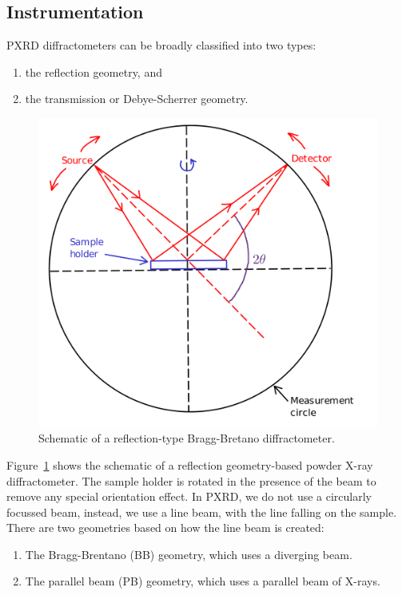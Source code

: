 \subsection{Instrumentation}

	PXRD diffractometers can be broadly classified into two types:%
%	
	\begin{enumerate}%
%	
	    \item the reflection geometry, and
	    
	    \item the transmission or Debye-Scherrer geometry.
	    
	\end{enumerate}
	
	\begin{figure}
		\centering
		\includegraphics[scale=0.15]{bragg_bretano_diff.png}
		\caption{\label{fig:bragg_bretano_diff}Schematic of a reflection-type Bragg-Bretano diffractometer.}
	\end{figure}
	
	Figure~\ref{fig:bragg_bretano_diff} shows the schematic of a reflection geometry-based powder X-ray diffractometer. The sample holder is rotated in the presence of the beam to remove any special orientation effect. In PXRD, we do not use a circularly focussed beam, instead, we use a line beam, with the line falling on the sample. There are two geometries based on how the line beam is created:%
%	
	\begin{enumerate}%
%	
	    \item The Bragg-Brentano (BB) geometry, which uses a diverging beam.
	    
	    \item The parallel beam (PB) geometry, which uses a parallel beam of X-rays.
	    
	\end{enumerate}
	
